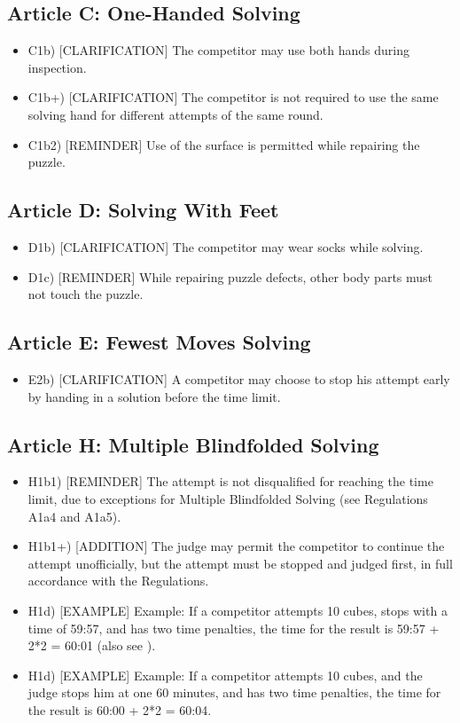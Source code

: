 \subsection{ Article C: One-Handed Solving}

\begin{itemize}
\item
  C1b) {[}CLARIFICATION{]} The competitor may use both hands during
  inspection.
\item
  C1b+) {[}CLARIFICATION{]} The competitor is not required to use the
  same solving hand for different attempts of the same round.
\item
  C1b2) {[}REMINDER{]} Use of the surface is permitted while repairing
  the puzzle.
\end{itemize}

\subsection{ Article D: Solving With Feet}

\begin{itemize}
\item
  D1b) {[}CLARIFICATION{]} The competitor may wear socks while solving.
\item
  D1c) {[}REMINDER{]} While repairing puzzle defects, other body parts
  must not touch the puzzle.
\end{itemize}

\subsection{ Article E: Fewest Moves Solving}

\begin{itemize}
\item
  E2b) {[}CLARIFICATION{]} A competitor may choose to stop his attempt
  early by handing in a solution before the time limit.
\end{itemize}

\subsection{ Article H: Multiple Blindfolded Solving}

\begin{itemize}
\item
  H1b1) {[}REMINDER{]} The attempt is not disqualified for reaching the
  time limit, due to exceptions for Multiple Blindfolded Solving (see
  Regulations A1a4 and A1a5).
\item
  H1b1+) {[}ADDITION{]} The judge may permit the competitor to continue
  the attempt unofficially, but the attempt must be stopped and judged
  first, in full accordance with the Regulations.
\item
  H1d) {[}EXAMPLE{]} Example: If a competitor attempts 10 cubes, stops
  with a time of 59:57, and has two time penalties, the time for the
  result is 59:57 + 2*2 = 60:01 (also see ).
\item
  H1d) {[}EXAMPLE{]} Example: If a competitor attempts 10 cubes, and the
  judge stops him at one 60 minutes, and has two time penalties, the
  time for the result is 60:00 + 2*2 = 60:04.
\end{itemize}

